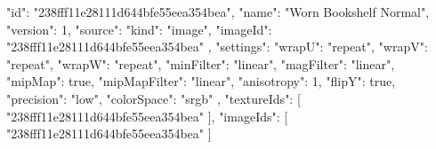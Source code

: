 {
  "id": "238fff11e28111d644bfe55eea354bea",
  "name": "Worn Bookshelf Normal",
  "version": 1,
  "source": {
    "kind": "image",
    "imageId": "238fff11e28111d644bfe55eea354bea"
  },
  "settings": {
    "wrapU": "repeat",
    "wrapV": "repeat",
    "wrapW": "repeat",
    "minFilter": "linear",
    "magFilter": "linear",
    "mipMap": true,
    "mipMapFilter": "linear",
    "anisotropy": 1,
    "flipY": true,
    "precision": "low",
    "colorSpace": "srgb"
  },
  "textureIds": [
    "238fff11e28111d644bfe55eea354bea"
  ],
  "imageIds": [
    "238fff11e28111d644bfe55eea354bea"
  ]
}
